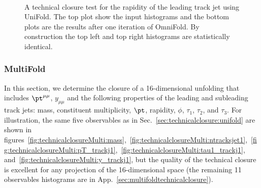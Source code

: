 \begin{figure}[h!]
\centering
{}\\
\caption{A technical closure test for the rapidity of the leading track jet using UniFold.  The top plot show the input histograms and the bottom plots are the results after one iteration of OmniFold.  By construction the top left and top right histograms are statistically identical.}
\label{fig:technicalclosure:y_trackj1}
\end{figure}

\subsubsection{MultiFold}
\label{sec:technicalclosure:multifold}

In this section, we determine the closure of a 16-dimensional unfolding that includes $\pt^{\mu\mu}$, $y_{\mu\mu}$ and the following properties of the leading and subleading track jets: mass, constituent multiplicity, $\pt$, rapidity, $\phi$, $\tau_1$, $\tau_2$, and $\tau_3$.  For illustration, the same five observables as in Sec.~\ref{sec:technicalclosure:unifold} are shown in figures~\ref{fig:technicalclosureMulti:mass},~\ref{fig:technicalclosureMulti:ntracksjet1},~\ref{fig:technicalclosureMulti:pT_trackj1},~\ref{fig:technicalclosureMulti:tau1_trackj1}, and~\ref{fig:technicalclosureMulti:y_trackj1}, but the quality of the technical closure is excellent for any projection of the 16-dimensional space (the remaining 11 observables histograms are in App.~\ref{sec:multifoldtechnicalclosure}).


